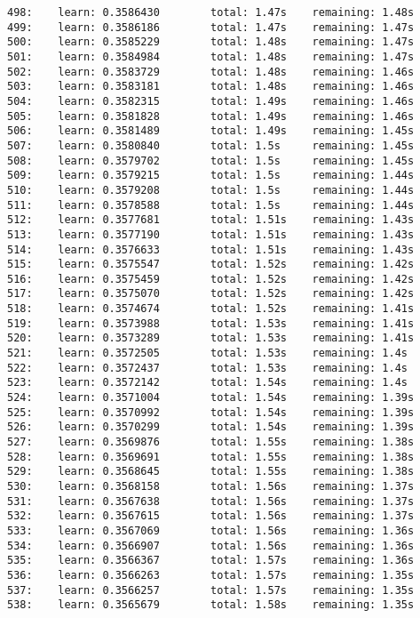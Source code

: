 \documentclass[11pt]{article}
\begin{document}
\begin{Verbatim}[commandchars=\\\{\}]
498:    learn: 0.3586430        total: 1.47s    remaining: 1.48s
499:    learn: 0.3586186        total: 1.47s    remaining: 1.47s
500:    learn: 0.3585229        total: 1.48s    remaining: 1.47s
501:    learn: 0.3584984        total: 1.48s    remaining: 1.47s
502:    learn: 0.3583729        total: 1.48s    remaining: 1.46s
503:    learn: 0.3583181        total: 1.48s    remaining: 1.46s
504:    learn: 0.3582315        total: 1.49s    remaining: 1.46s
505:    learn: 0.3581828        total: 1.49s    remaining: 1.46s
506:    learn: 0.3581489        total: 1.49s    remaining: 1.45s
507:    learn: 0.3580840        total: 1.5s     remaining: 1.45s
508:    learn: 0.3579702        total: 1.5s     remaining: 1.45s
509:    learn: 0.3579215        total: 1.5s     remaining: 1.44s
510:    learn: 0.3579208        total: 1.5s     remaining: 1.44s
511:    learn: 0.3578588        total: 1.5s     remaining: 1.44s
512:    learn: 0.3577681        total: 1.51s    remaining: 1.43s
513:    learn: 0.3577190        total: 1.51s    remaining: 1.43s
514:    learn: 0.3576633        total: 1.51s    remaining: 1.43s
515:    learn: 0.3575547        total: 1.52s    remaining: 1.42s
516:    learn: 0.3575459        total: 1.52s    remaining: 1.42s
517:    learn: 0.3575070        total: 1.52s    remaining: 1.42s
518:    learn: 0.3574674        total: 1.52s    remaining: 1.41s
519:    learn: 0.3573988        total: 1.53s    remaining: 1.41s
520:    learn: 0.3573289        total: 1.53s    remaining: 1.41s
521:    learn: 0.3572505        total: 1.53s    remaining: 1.4s
522:    learn: 0.3572437        total: 1.53s    remaining: 1.4s
523:    learn: 0.3572142        total: 1.54s    remaining: 1.4s
524:    learn: 0.3571004        total: 1.54s    remaining: 1.39s
525:    learn: 0.3570992        total: 1.54s    remaining: 1.39s
526:    learn: 0.3570299        total: 1.54s    remaining: 1.39s
527:    learn: 0.3569876        total: 1.55s    remaining: 1.38s
528:    learn: 0.3569691        total: 1.55s    remaining: 1.38s
529:    learn: 0.3568645        total: 1.55s    remaining: 1.38s
530:    learn: 0.3568158        total: 1.56s    remaining: 1.37s
531:    learn: 0.3567638        total: 1.56s    remaining: 1.37s
532:    learn: 0.3567615        total: 1.56s    remaining: 1.37s
533:    learn: 0.3567069        total: 1.56s    remaining: 1.36s
534:    learn: 0.3566907        total: 1.56s    remaining: 1.36s
535:    learn: 0.3566367        total: 1.57s    remaining: 1.36s
536:    learn: 0.3566263        total: 1.57s    remaining: 1.35s
537:    learn: 0.3566257        total: 1.57s    remaining: 1.35s
538:    learn: 0.3565679        total: 1.58s    remaining: 1.35s

\end{Verbatim}
\end{document}
